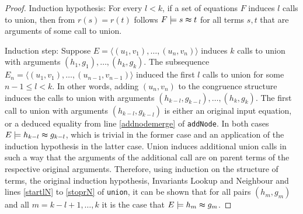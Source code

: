 \begin{proof}
Induction hypothesis: For every $l < k$, if a set of equations $F$ induces $l$ calls to union, then from $r(s) = r(t)$ follows $F \models s \thickapprox t$ for all terms $s,t$ that are arguments of some call to union.

Induction step: Suppose $E = \langle (u_1,v_1), \ldots, (u_n,v_n) \rangle$ induces $k$ calls to union with arguments $(h_1,g_1),\ldots,(h_k,g_k)$.
The subsequence $E_n = \langle (u_1,v_1), \ldots, (u_{n-1},v_{n-1}) \rangle$ induced the first $l$ calls to union for some $n-1 \leq l < k$.
In other words, adding $(u_n,v_n)$ to the congruence structure induces the calls to union with arguments $(h_{k-l},g_{k-l}),\ldots,(h_k,g_k)$.
The first call to union with arguments $(h_{k-l},g_{k-l})$ is either an original input equation, or a deduced equality from line \ref{addnodemerge} of \texttt{addNode}.
In both cases $E \models h_{k-l} \thickapprox g_{k-l}$, which is trivial in the former case and an application of the induction hypothesis in the latter case.
Union induces additional union calls in such a way that the arguments of the additional call are on parent terms of the respective original arguments.
Therefore, using induction on the structure of terms, the original induction hypothesis, Invariants Lookup and Neighbour and lines \ref{startlN} to \ref{stoprN} of \texttt{union}, it can be shown that for all pairs $(h_m,g_m)$ and all $m = k-l+1,\ldots,k$ it is the case that $E \models h_m \thickapprox g_m$.

%
%
%


\end{proof}

